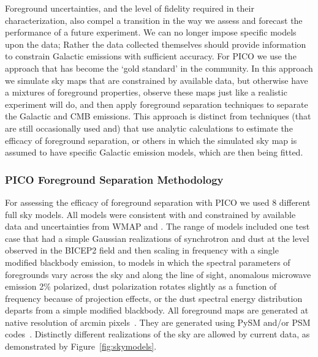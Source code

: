 \documentclass[PICOReport.tex]{subfiles}
\begin{document}
Foreground uncertainties, and the level of fidelity required in their characterization, also compel a transition in the way we assess and forecast the performance of a future experiment. We can no longer impose specific models upon the data;  Rather the data collected themselves should provide information to constrain Galactic emissions with sufficient accuracy. For PICO we use the approach that has become the `gold standard' in the community. In this approach we simulate sky maps that are constrained by available data, but otherwise have a mixtures of foreground properties, observe these maps just like a realistic experiment will do, and then apply foreground separation techniques to separate the Galactic and CMB emissions. This approach is distinct from techniques (that are still occasionally used and) that use analytic calculations to estimate the efficacy of foreground separation, or others in which the simulated sky map is assumed to have specific Galactic emission models, which are then being fitted. 


\subsubsection{PICO Foreground Separation Methodology}

 \hspace{0.1in} For assessing the efficacy of foreground separation with PICO we used 8 different full sky models. All models were consistent with and constrained by available data and uncertainties from WMAP and \planck . The range of models included one test case that had a simple Gaussian realizations of synchrotron and dust at the level observed in the BICEP2 field and then scaling in frequency with a single modified blackbody emission, to models in which the spectral parameters of foregrounds vary across the sky and along the line of sight, anomalous microwave emission  2\% polarized, dust polarization rotates slightly as a function of frequency because of projection effects, or the dust spectral energy distribution departs from a simple modified blackbody. All foreground maps are generated at native resolution of  arcmin pixels~\citep{healpix}. They are generated using PySM and/or PSM codes~\citep{??}.   Distinctly different realizations of the sky are allowed by current data, as demonstrated by Figure~\ref{fig:skymodels}. 
\end{document}
